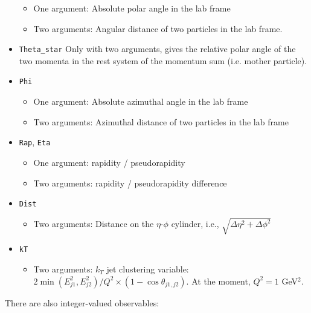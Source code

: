 \documentclass[12pt]{book}
\newcommand{\ttt}[1]{\texttt{#1}}
\begin{document}
\begin{itemize}
\begin{itemize}
  \item One argument: Absolute polar angle in the lab frame
  \item Two arguments: Angular distance of two particles in the lab frame.
  \end{itemize}
\item \ttt{Theta\_star}
  Only with two arguments, gives the relative polar angle of the two momenta
  in the rest system of the momentum sum (i.e. mother particle).
\item \ttt{Phi}
  \begin{itemize}
  \item One argument: Absolute azimuthal angle in the lab frame
  \item Two arguments: Azimuthal distance of two particles in the lab frame
  \end{itemize}
\item \ttt{Rap}, \ttt{Eta}
  \begin{itemize}
  \item One argument: rapidity / pseudorapidity
  \item Two arguments: rapidity / pseudorapidity difference
  \end{itemize}
\item \ttt{Dist}
  \begin{itemize}
  \item Two arguments: Distance on the $\eta$-$\phi$ cylinder, i.e.,
    $\sqrt{\Delta\eta^2 + \Delta\phi^2}$
  \end{itemize}
\item \ttt{kT}
  \begin{itemize}
  \item Two arguments: $k_T$ jet clustering variable:
    $2 \min (E_{j1}^2, E_{j2}^2) / Q^2 \times (1 -
    \cos\theta_{j1,j2})$. At the moment, $Q^2 = 1$ GeV$^2$.
  \end{itemize}
\end{itemize}
There are also integer-valued observables:
\end{document}
